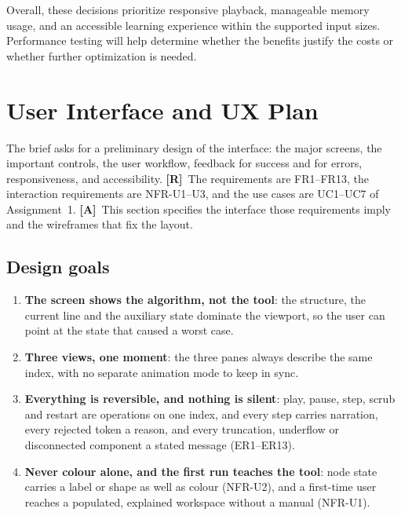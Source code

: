 \documentclass[11pt,a4paper]{article}
\newcommand{\R}{\textcolor{reqc}{\textbf{[R]}}}     %
\newcommand{\A}{\textcolor{asmc}{\textbf{[A]}}}     %
\begin{document}
Overall, these decisions prioritize responsive playback,
manageable memory usage, and an accessible learning experience
within the supported input sizes. Performance testing will
help determine whether the benefits justify the costs or
whether further optimization is needed.



\section{User Interface and UX Plan}

The brief asks for a preliminary design of the interface: the major screens, the important
controls, the user workflow, feedback for success and for errors, responsiveness, and
accessibility. \R\ The requirements are FR1--FR13, the interaction requirements are NFR-U1--U3,
and the use cases are UC1--UC7 of Assignment~1. \A\ This section specifies the interface those
requirements imply and the wireframes that fix the layout.

\subsection{Design goals}

\begin{enumerate}[leftmargin=1.6em,topsep=2pt,itemsep=1pt]
  \item \textbf{The screen shows the algorithm, not the tool}: the structure, the current line
        and the auxiliary state dominate the viewport, so the user can point at the state that
        caused a worst case.
  \item \textbf{Three views, one moment}: the three panes always describe the same index, with
        no separate animation mode to keep in sync.
  \item \textbf{Everything is reversible, and nothing is silent}: play, pause, step, scrub and
        restart are operations on one index, and every step carries narration, every rejected
        token a reason, and every truncation, underflow or disconnected component a stated
        message (ER1--ER13).
  \item \textbf{Never colour alone, and the first run teaches the tool}: node state carries a
        label or shape as well as colour (NFR-U2), and a first-time user reaches a populated,
        explained workspace without a manual (NFR-U1).
\end{enumerate}
\end{document}
